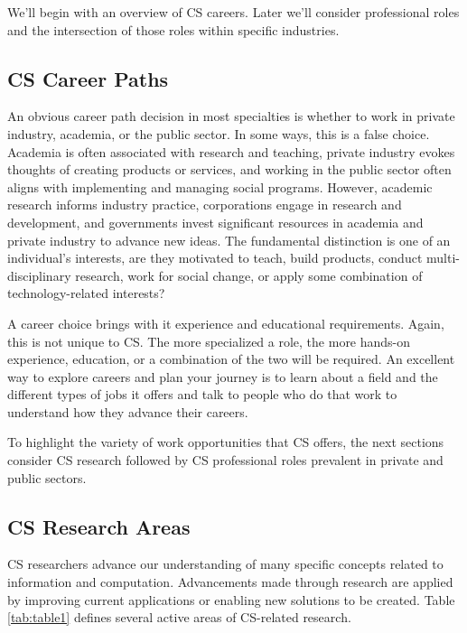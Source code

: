 We'll begin with an overview of CS careers. Later we'll consider professional roles and the intersection of those roles within specific industries.

\subsection{CS Career Paths}

An obvious career path decision in most specialties is whether to work in private industry, academia, or the public sector. In some ways, this is a false choice. Academia is often associated with research and teaching, private industry evokes thoughts of creating products or services, and working in the public sector often aligns with implementing and managing social programs. However, academic research informs industry practice, corporations engage in research and development, and governments invest significant resources in academia and private industry to advance new ideas. The fundamental distinction is one of an individual's interests, are they motivated to teach, build products, conduct multi-disciplinary research, work for social change, or apply some combination of technology-related interests?

A career choice brings with it experience and educational requirements. Again, this is not unique to CS. The more specialized a role, the more hands-on experience, education, or a combination of the two will be required. An excellent way to explore careers and plan your journey is to learn about a field and the different types of jobs it offers and talk to people who do that work to understand how they advance their careers. 

To highlight the variety of work opportunities that CS offers, the next sections consider CS research followed by CS professional roles prevalent in private and public sectors. 

\subsection{CS Research Areas}

CS researchers advance our understanding of many specific concepts related to information and computation. Advancements made through research are applied by improving current applications or enabling new solutions to be created. Table \ref{tab:table1} defines several active areas of CS-related research.

